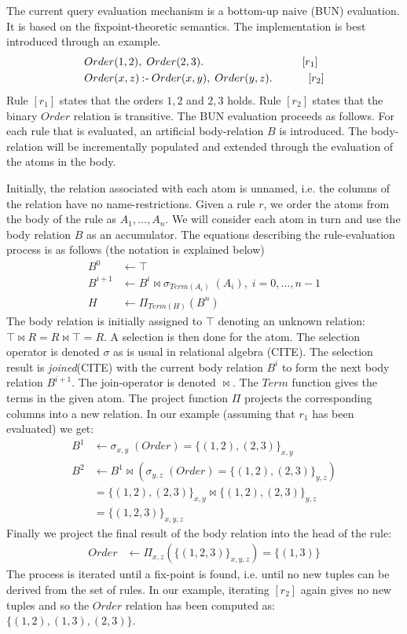 The current query evaluation mechanism is a bottom-up naive (BUN) \cite{Green:2013:DRQ:2688167.2688168} evaluation. It is based on the fixpoint-theoretic semantics. The implementation is best introduced through an example.
\begin{align*}
&Order(1, 2),\; Order(2, 3). \quad\quad\quad\quad\quad\quad\quad\quad\quad[r_1]\\
&Order(x, z) \mathbin{:\hspace{-0.5ex}\textsf{-}} Order(x, y),\; Order(y, z). \;\quad\quad\quad[r_2]
\end{align*}
\noindent
Rule $[r_1]$ states that the orders $1, 2$ and $2, 3$ holds. Rule $[r_2]$ states that the binary $Order$ relation is transitive. The BUN evaluation proceeds as follows. For each rule that is evaluated, an artificial body-relation $B$ is introduced. The body-relation will be incrementally populated and extended through the evaluation of the atoms in the body. 

Initially, the relation associated with each atom is unnamed, i.e. the columns of the relation have no name-restrictions. Given a rule $r$, we order the atoms from the body of the rule as $A_1, \ldots, A_n$. We will consider each atom in turn and use the body relation $B$ as an accumulator. The equations describing the rule-evaluation process is as follows (the notation is explained below)
\begin{align*}
B^{0} &\leftarrow \top \\
B^{i + 1} &\leftarrow B^{i} \bowtie \sigma_{Term(A_i)}\;(A_i), \; i = 0, \ldots, n - 1\\
H & \leftarrow \Pi_{Term(H)}(B^n)
\end{align*}
\noindent
The body relation is initially assigned to $\top$ denoting an unknown relation: $\top \bowtie R = R \bowtie \top = R$. A selection is then done for the atom. The selection operator is denoted $\sigma$ as is usual in relational algebra (CITE). The selection result is \textit{joined}(CITE) with the current body relation $B^{i}$ to form the next body relation $B^{i + 1}$. The join-operator is denoted $\bowtie$. The $Term$ function gives the terms in the given atom. The project function $\Pi$ projects the corresponding columns into a new relation. In our example (assuming that $r_1$ has been evaluated) we get:
\begin{align*}
B^{1} &\leftarrow \sigma_{x, y}\;(Order) = \{(1, 2), (2, 3)\}_{x, y}\\
B^{2} &\leftarrow B^{1} \bowtie (\sigma_{y, z}\;(Order) = \{(1, 2), (2, 3)\}_{y, z})\\
      &= \{(1, 2), (2, 3)\}_{x, y} \bowtie \{(1, 2), (2, 3)\}_{y, z}\\
      &= \{(1,2,3)\}_{x,y,z}
\end{align*}
\noindent
Finally we project the final result of the body relation into the head of the rule:
\begin{align*}
Order & \leftarrow \Pi_{x,z}(\{(1,2,3)\}_{x,y,z}) = \{(1,3)\}
\end{align*}
\noindent
The process is iterated until a fix-point is found, i.e. until no new tuples can be derived from the set of rules. In our example, iterating $[r_2]$ again gives no new tuples and so the $Order$ relation has been computed as: $\{(1,2), (1,3), (2,3) \}$.

